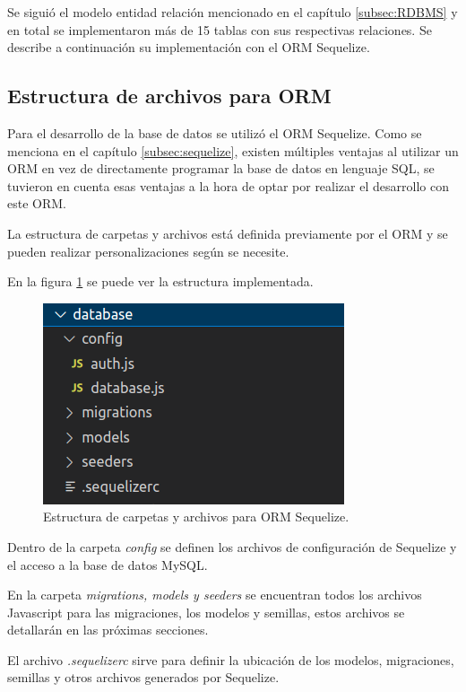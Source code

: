 Se siguió el modelo entidad relación mencionado en el capítulo \ref{subsec:RDBMS} y en total se implementaron más de 15 tablas con sus respectivas relaciones. Se describe a continuación su implementación con el ORM Sequelize. 



\subsection{Estructura de archivos para ORM}
\label{subsec:estructuraorm}
Para el desarrollo de la base de datos se utilizó el ORM Sequelize. Como se menciona en el capítulo \ref{subsec:sequelize}, existen múltiples ventajas al utilizar un ORM en vez de directamente programar la base de datos en lenguaje SQL, se tuvieron en cuenta esas ventajas a la hora de optar por realizar el desarrollo con este ORM. 

La estructura de carpetas y archivos está definida previamente por el ORM y se pueden realizar personalizaciones según se necesite. 

En la figura \ref{fig:estructuraorm} se puede ver la estructura implementada.

\begin{figure}[h]
	\centering
	\includegraphics[scale=.50]{./Figures/estructuraorm.png}
	\caption{Estructura de carpetas y archivos para ORM Sequelize.}
	\label{fig:estructuraorm}
\end{figure}

Dentro de la carpeta \textit{config} se definen los archivos de configuración de Sequelize y el acceso a la base de datos MySQL.

En la carpeta \textit{migrations, models y seeders} se encuentran todos los archivos Javascript para las migraciones, los modelos y semillas, estos archivos se detallarán en las próximas secciones. 

El archivo \textit{.sequelizerc} sirve para definir la ubicación de los modelos, migraciones, semillas y otros archivos generados por Sequelize.


